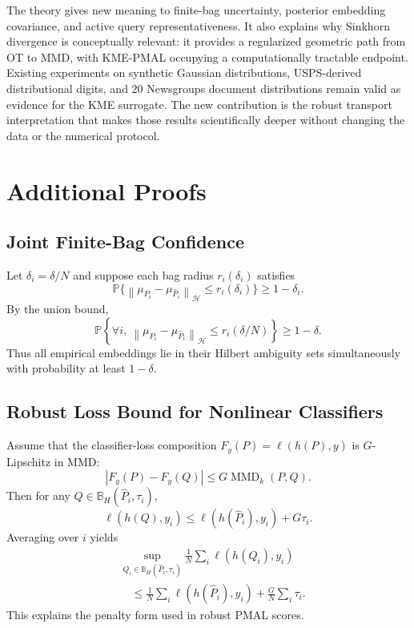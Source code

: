 \documentclass[10pt,journal]{IEEEtran}
\DeclareMathOperator{\MMD}{MMD}
\newcommand{\Prob}{\mathbb{P}}
\newcommand{\Hcal}{\mathcal{H}}
\newcommand{\wh}{\widehat}
\newcommand{\norm}[1]{\left\lVert #1 \right\rVert}
\newcommand{\ball}{\mathbb{B}}
\begin{document}
The theory gives new meaning to finite-bag uncertainty, posterior embedding covariance, and active query representativeness. It also explains why Sinkhorn divergence is conceptually relevant: it provides a regularized geometric path from OT to MMD, with KME-PMAL occupying a computationally tractable endpoint. Existing experiments on synthetic Gaussian distributions, USPS-derived distributional digits, and 20 Newsgroups document distributions remain valid as evidence for the KME surrogate. The new contribution is the robust transport interpretation that makes those results scientifically deeper without changing the data or the numerical protocol.

\appendices

\section{Additional Proofs}
\label{app:proofs}

\subsection{Joint Finite-Bag Confidence}

Let $\delta_i=\delta/N$ and suppose each bag radius $r_i(\delta_i)$ satisfies
\begin{equation}
    \Prob\{\norm{\mu_{P_i}-\mu_{\wh P_i}}_{\Hcal}\le r_i(\delta_i)\}\ge 1-\delta_i.
\end{equation}
By the union bound,
\begin{equation}
    \Prob\left\{\forall i,\ \norm{\mu_{P_i}-\mu_{\wh P_i}}_{\Hcal}\le r_i(\delta/N)\right\}\ge 1-\delta.
\end{equation}
Thus all empirical embeddings lie in their Hilbert ambiguity sets simultaneously with probability at least $1-\delta$.

\subsection{Robust Loss Bound for Nonlinear Classifiers}

Assume that the classifier-loss composition $F_y(P)=\ell(h(P),y)$ is $G$-Lipschitz in MMD:
\begin{equation}
    |F_y(P)-F_y(Q)|\le G\MMD_k(P,Q).
\end{equation}
Then for any $Q\in\ball_H(\wh P_i,\tau_i)$,
\begin{equation}
    \ell(h(Q),y_i)\le \ell(h(\wh P_i),y_i)+G\tau_i.
\end{equation}
Averaging over $i$ yields
\begin{equation}
\begin{aligned}
&\sup_{Q_i\in\ball_H(\wh P_i,\tau_i)}
\frac{1}{N}\sum_i\ell(h(Q_i),y_i)\\
&\quad\le
\frac{1}{N}\sum_i\ell(h(\wh P_i),y_i)
+\frac{G}{N}\sum_i\tau_i.
\end{aligned}
\end{equation}
This explains the penalty form used in robust PMAL scores.
\end{document}

